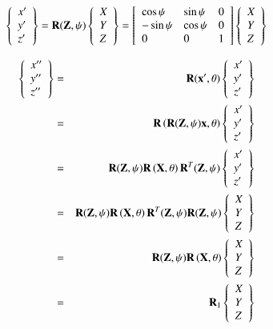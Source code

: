 \begin{eqnarray}
\left\{\begin{array}{l}x'\\ y'\\ z' \end{array}\right\}
=
\mathbf{R}(\mathbf{Z},\psi)\left\{\begin{array}{l}X\\ Y\\ Z \end{array}\right\}
= \left[\begin{array}{lll}
\cos\psi &  \sin\psi & 0 \\
-\sin\psi & \cos\psi & 0 \\
0 & 0 & 1
\end{array} \right]
\left\{\begin{array}{l}X\\ Y\\ Z\end{array}\right\}
\end{eqnarray}


\begin{eqnarray}
\left\{\begin{array}{l}x''\\ y''\\ z''\end{array}\right\}
&=&
\mathbf{R}(\mathbf{x}',\theta)
\left\{\begin{array}{l}x'\\ y'\\ z' \end{array}\right\} \\
&=&
\mathbf{R}\left(\mathbf{R}(\mathbf{Z},\psi)\mathbf{x},\theta\right)
\left\{\begin{array}{l}x'\\ y'\\ z' \end{array}\right\} \\
&=&
\mathbf{R}(\mathbf{Z},\psi)\mathbf{R}\left(\mathbf{X},\theta\right)\mathbf{R}^T(\mathbf{Z},\psi)
\left\{\begin{array}{l}x'\\ y'\\ z' \end{array}\right\}\\
&=&
\mathbf{R}(\mathbf{Z},\psi)\mathbf{R}\left(\mathbf{X},\theta\right)\mathbf{R}^T(\mathbf{Z},\psi)\mathbf{R}(\mathbf{Z},\psi)
\left\{\begin{array}{l}X\\ Y\\ Z \end{array}\right\} \\
&=&
\mathbf{R}(\mathbf{Z},\psi)\mathbf{R}\left(\mathbf{X},\theta\right)
\left\{\begin{array}{l}X\\ Y\\ Z \end{array}\right\} \\
&=& \mathbf{R}_1
\left\{\begin{array}{l}X\\ Y\\ Z \end{array}\right\}
\end{eqnarray}

